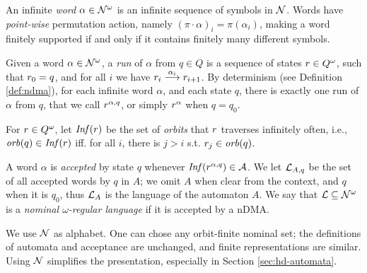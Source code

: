 \begin{definition}
\label{def:inf-word}
 An infinite \emph{word} $\alpha \in \mathcal{N}^\omega$ is an infinite sequence of symbols in $\mathcal{N}$. Words have \emph{point-wise} permutation action, namely $(\pi \cdot \alpha)_i = \pi(\alpha_i)$, making a word finitely supported if and only if it contains finitely many different symbols. 
\end{definition}

\begin{definition}\label{def:nominal-run}
 Given a word $\alpha \in \mathcal{N}^\omega$, a \emph{run} of $\alpha$ from $q \in Q$ is a sequence of states $r \in Q^\omega$, such that $r_0 = q$, and for all $i$ we have $r_i \overset{\alpha_i}{\longrightarrow} r_{i+1}$. 
 By determinism (see Definition \ref{def:ndma}), for each infinite word $\alpha$, and each state $q$, there is exactly one run of $\alpha$ from $q$, that we call $r^{\alpha,q}$, or simply $r^{\alpha}$ when $q=q_0$.
\end{definition}

\begin{definition}\label{def:inf-set}
 For $r \in Q^\omega$, let $\mathit{Inf}(r)$ be the set of \emph{orbits} that $r$ traverses infinitely often, i.e., $\mathit{orb}(q) \in \mathit{Inf}(r)$ iff. for all $i$, there is $j > i$ s.t. $r_j \in \mathit{orb}(q)$.
\end{definition}

\begin{definition}
 A word $\alpha$ is \emph{accepted} by state $q$ whenever $\mathit{Inf}(r^{\alpha,q}) \in \mathcal{A}$. We let $\mathcal{L}_{A,q}$ be the set of all accepted words by $q$ in $A$; we omit $A$ when clear from the context, and $q$ when it is $q_0$, thus $\mathcal{L}_A$ is the language of the automaton $A$. We say that $\mathcal{L} \subseteq \mathcal{N}^\omega$ is a \emph{nominal $\omega$-regular language} if it is accepted by a nDMA.
\end{definition}

\begin{remark}\label{rem:simple-alphabet} We use $\mathcal{N}$ as alphabet. One can chose any orbit-finite nominal set; the definitions of automata and acceptance are unchanged, and finite representations are similar.
%
Using $\mathcal{N}$ simplifies the presentation, especially in Section \ref{sec:hd-automata}.
\end{remark}

